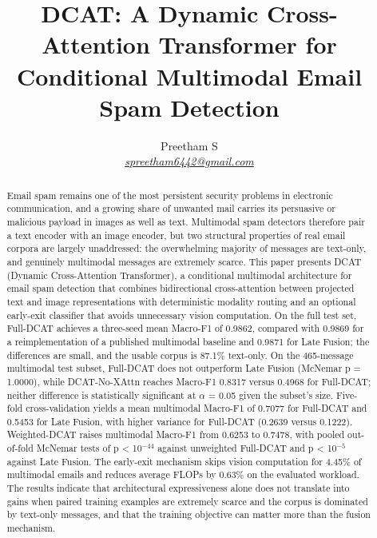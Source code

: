 \documentclass[10pt,twoside]{article}
\title{\bfseries DCAT: A Dynamic Cross-Attention Transformer for Conditional Multimodal Email Spam Detection}
\author{Preetham S\\{\normalsize\itshape \href{mailto:spreetham6442@gmail.com}{spreetham6442@gmail.com}}}
\date{}
\begin{document}
\maketitle
\thispagestyle{fancy}
\begin{abstract}
\noindent
Email spam remains one of the most persistent security problems in electronic communication, and a growing share of unwanted mail carries its persuasive or malicious payload in images as well as text. Multimodal spam detectors therefore pair a text encoder with an image encoder, but two structural properties of real email corpora are largely unaddressed: the overwhelming majority of messages are text-only, and genuinely multimodal messages are extremely scarce. This paper presents DCAT (Dynamic Cross-Attention Transformer), a conditional multimodal architecture for email spam detection that combines bidirectional cross-attention between projected text and image representations with deterministic modality routing and an optional early-exit classifier that avoids unnecessary vision computation. On the full test set, Full-DCAT achieves a three-seed mean Macro-F1 of 0.9862, compared with 0.9869 for a reimplementation of a published multimodal baseline and 0.9871 for Late Fusion; the differences are small, and the usable corpus is 87.1\% text-only. On the 465-message multimodal test subset, Full-DCAT does not outperform Late Fusion (McNemar p = 1.0000), while DCAT-No-XAttn reaches Macro-F1 0.8317 versus 0.4968 for Full-DCAT; neither difference is statistically significant at $\alpha$ = 0.05 given the subset's size. Five-fold cross-validation yields a mean multimodal Macro-F1 of 0.7077 for Full-DCAT and 0.5453 for Late Fusion, with higher variance for Full-DCAT (0.2639 versus 0.1222). Weighted-DCAT raises multimodal Macro-F1 from 0.6253 to 0.7478, with pooled out-of-fold McNemar tests of p < 10$^{-44}$ against unweighted Full-DCAT and p < 10$^{-5}$ against Late Fusion. The early-exit mechanism skips vision computation for 4.45\% of multimodal emails and reduces average FLOPs by 0.63\% on the evaluated workload. The results indicate that architectural expressiveness alone does not translate into gains when paired training examples are extremely scarce and the corpus is dominated by text-only messages, and that the training objective can matter more than the fusion mechanism.
\end{abstract}

\vspace{2pt}
\end{document}
